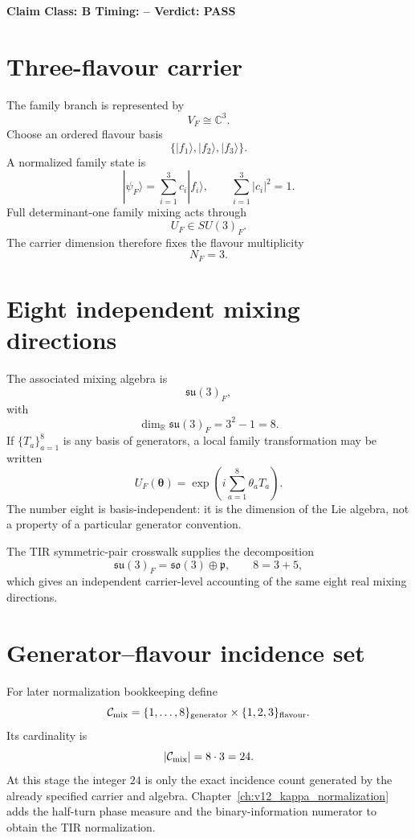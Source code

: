 \documentclass[11pt,a4paper,twoside]{book}
\theoremstyle{definition}
\newcommand{\vTwelveStatus}[3]{\par\noindent\textbf{Claim Class: #1 \quad Timing: #2 \quad Verdict: #3}\par}
\begin{document}
\vTwelveStatus{B}{--}{PASS}

\section{Three-flavour carrier}
The family branch is represented by
\begin{equation}
\boxed{V_F\cong\mathbb C^3.}
\label{eq:v12-flavour-carrier}
\end{equation}
Choose an ordered flavour basis
\[
\{|f_1\rangle,|f_2\rangle,|f_3\rangle\}.
\]
A normalized family state is
\[
|\psi_F\rangle
=\sum_{i=1}^{3}c_i|f_i\rangle,
\qquad
\sum_{i=1}^{3}|c_i|^2=1.
\]
Full determinant-one family mixing acts through
\begin{equation}
\boxed{U_F\in SU(3)_F.}
\label{eq:v12-su3f-carrier}
\end{equation}
The carrier dimension therefore fixes the flavour multiplicity
\begin{equation}
\boxed{N_F=3.}
\label{eq:v12-flavour-multiplicity}
\end{equation}

\section{Eight independent mixing directions}
The associated mixing algebra is
\[
\mathfrak{su}(3)_F,
\]
with
\begin{equation}
\boxed{
\dim_{\mathbb R}\mathfrak{su}(3)_F
=3^2-1
=8.
}
\label{eq:v12-su3f-dimension}
\end{equation}
If $\{T_a\}_{a=1}^{8}$ is any basis of generators, a local family
transformation may be written
\[
U_F(\boldsymbol\theta)
=\exp\!\left(i\sum_{a=1}^{8}\theta_aT_a\right).
\]
The number eight is basis-independent: it is the dimension of the Lie algebra,
not a property of a particular generator convention.

The TIR symmetric-pair crosswalk supplies the decomposition
\begin{equation}
\mathfrak{su}(3)_F
=\mathfrak{so}(3)\oplus\mathfrak p,
\qquad
8=3+5,
\label{eq:v12-su3-symmetric-pair}
\end{equation}
which gives an independent carrier-level accounting of the same eight real
mixing directions.

\section{Generator--flavour incidence set}
For later normalization bookkeeping define
\begin{equation}
\mathcal C_{\rm mix}
=\{1,\ldots,8\}_{\rm generator}
\times\{1,2,3\}_{\rm flavour}.
\label{eq:v12-mixing-incidence-set}
\end{equation}
Its cardinality is
\begin{equation}
|\mathcal C_{\rm mix}|
=8\cdot3
=24.
\label{eq:v12-mixing-incidence-cardinality}
\end{equation}
At this stage the integer $24$ is only the exact incidence count generated by
the already specified carrier and algebra.  Chapter~\ref{ch:v12_kappa_normalization}
adds the half-turn phase measure and the binary-information numerator to obtain
the TIR normalization.
\end{document}
